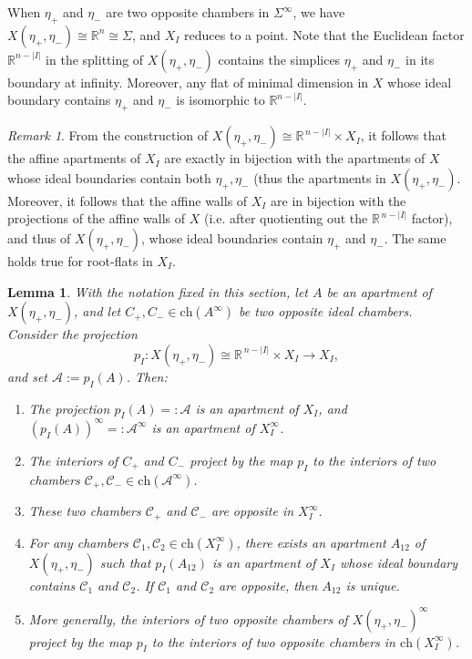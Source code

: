 \documentclass[11pt]{amsart}
\newcommand{\Ch}{\mathrm{ch}}
\theoremstyle{plain}
\newtheorem{lem}[thm]{Lemma}
\theoremstyle{definition}
\theoremstyle{remark}
\newtheorem{rem}[thm]{Remark}
\begin{document}
	When \( \eta_{+} \) and \( \eta_{-} \) are two opposite chambers in \(\Sigma^\infty\), we have \( X(\eta_{+}, \eta_{-}) \cong \mathbb{R}^{n} \cong \Sigma \), and \( X_I \) reduces to a point. Note that the Euclidean factor \( \mathbb{R}^{n - |I|} \) in the splitting of \( X(\eta_{+}, \eta_{-}) \) contains the simplices \( \eta_{+} \) and \( \eta_{-} \) in its boundary at infinity. Moreover, any flat of minimal dimension in \( X \) whose ideal boundary contains \( \eta_{+} \) and \( \eta_{-} \) is isomorphic to \( \mathbb{R}^{n - |I|} \).
	
	\begin{rem}
		\label{rem::apartments_panel_building}
		From the construction of $X(\eta_{+},\eta_{-}) \cong \mathbb{R}^{\,n - |I|} \times X_I$, it follows that the affine apartments of $X_I$  are exactly in bijection with the apartments of $X$ whose ideal boundaries contain both $\eta_+, \eta_-$ (thus the apartments in $X(\eta_{+},\eta_{-})$. Moreover, it follows that the affine walls of $X_I$ are in bijection with the projections of the affine walls of $X$ (i.e. after quotienting out the $\mathbb{R}^{\,n - |I|}$ factor), and thus of $X(\eta_{+},\eta_{-})$, whose ideal boundaries contain $\eta_{+}$ and $\eta_{-}$. The same holds true for root-flats in $X_I$.
	\end{rem}
	
	\begin{lem}
		\label{lem::opposition_projection}
		With the notation fixed in this section, let $A$ be an apartment of
		$X(\eta_{+},\eta_{-})$, and let $C_{+}, C_{-} \in \Ch(A^{\infty})$ be two opposite
		ideal chambers. Consider the projection
		\[
		p_I : X(\eta_{+},\eta_{-})
		\cong \mathbb{R}^{\,n - |I|} \times X_{I}
		\longrightarrow
		X_{I},
		\]
		and set $\mathcal{A} := p_I(A)$.  Then:
		\begin{enumerate}
			\item The projection $p_I(A)=:\mathcal A$ is an apartment of $X_I$, and $(p_I(A))^\infty=:\mathcal A^\infty$ is an apartment of $X_I^\infty$.
			\item The interiors of $C_+$ and $C_-$ project by the map $p_I$ to the interiors of two chambers $\mathcal C_+,\mathcal C_-\in\Ch(\mathcal A^\infty)$.
			\item These two chambers $\mathcal C_+$ and $\mathcal C_-$ are opposite in $X_I^\infty$.
			\item For any chambers $\mathcal C_1,\mathcal C_2\in\Ch(X_I^\infty)$, there exists an apartment $A_{12}$ of $X(\eta_+,\eta_-)$ such that $p_I(A_{12})$ is an apartment of $X_I$ whose ideal boundary contains $\mathcal C_1$ and $\mathcal C_2$.  If $\mathcal C_1$ and $\mathcal C_2$ are opposite, then $A_{12}$ is unique.
			\item More generally, the interiors of two opposite chambers of $X(\eta_+,\eta_-)^\infty$ project by the map $p_I$ to the interiors of two opposite chambers in $\Ch(X_I^\infty)$.
		\end{enumerate}
	\end{lem}
	
\end{document}
